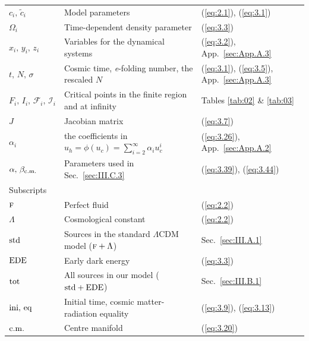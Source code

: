 \documentclass[aps,prd,twocolumn]{revtex4-2}
\newcommand\subcm{{\rm c.m.}}
\newcommand\subEDE{{\rm EDE}}
\newcommand\subeq{{\rm eq}}
\newcommand\subF{\textsc{f}}
\newcommand\subini{{\rm ini}}
\newcommand\substd{{\rm std}}
\newcommand\subtot{{\rm tot}}
\begin{document}
\begin{table}[!t]
\begin{minipage}{0.88\textwidth}
\begin{tabular*}{\hsize}{@{\ \ }@{\extracolsep{\fill}}lll@{\ \ }}
    $c_i,\,\tilde{c}_i$         &  Model parameters                                        &  (\ref{eq:2.1}), (\ref{eq:3.1})  \\
    $\Omega_i$                  &  Time-dependent density parameter                        &  (\ref{eq:3.3})  \\
    $x_i,\,y_i,\,z_i$           &  Variables for the dynamical systems                     &  (\ref{eq:3.2}), App.~\ref{sec:App.A.3}  \\
    $t,\,N,\,\sigma$            &  Cosmic time, \textit{e}-folding number, the rescaled $N$  &  (\ref{eq:3.1}), (\ref{eq:3.5}), App.~\ref{sec:App.A.3}  \\
    $F_i,\,I_i,\,\mathcal{F}_i,\,\mathcal{I}_i$  &  Critical points in the finite region and at infinity  &  Tables \ref{tab:02} \& \ref{tab:03}  \\
    $J$                         &  Jacobian matrix                                         &  (\ref{eq:3.7})  \\
    $\alpha_i$                  &  the coefficients in $u_h=\phi(u_c)=\sum_{i=2}^{\infty}\alpha_i u_c^i$  &  (\ref{eq:3.26}), App.~\ref{sec:App.A.2}  \\
    $\alpha,\,\beta_\subcm$     &  Parameters used in Sec.~\ref{sec:III.C.3}               &  (\ref{eq:3.39}), (\ref{eq:3.44})  \\[1mm]
    \hline
    Subscripts                                    \\
    $\subF$                     &  Perfect fluid                                           &  (\ref{eq:2.2})  \\
    $\Lambda$                   &  Cosmological constant                                   &  (\ref{eq:2.2})  \\
    $\substd$                   &  Sources in the standard $\Lambda$CDM model ($\subF+\Lambda$)  &  Sec.~\ref{sec:III.A.1}  \\
    $\subEDE$                   &  Early dark energy                                       &  (\ref{eq:3.3})  \\
    $\subtot$                   &  All sources in our model ($\substd+\subEDE$)            &  Sec.~\ref{sec:III.B.1}  \\
    $\subini,\,\subeq$          &  Initial time, cosmic matter-radiation equality          &  (\ref{eq:3.9}), (\ref{eq:3.13})  \\
    $\subcm$                    &  Centre manifold  &  (\ref{eq:3.20})  \\
    \hline\hline
  \end{tabular*}
  \end{minipage}
\end{table}
\end{document}
